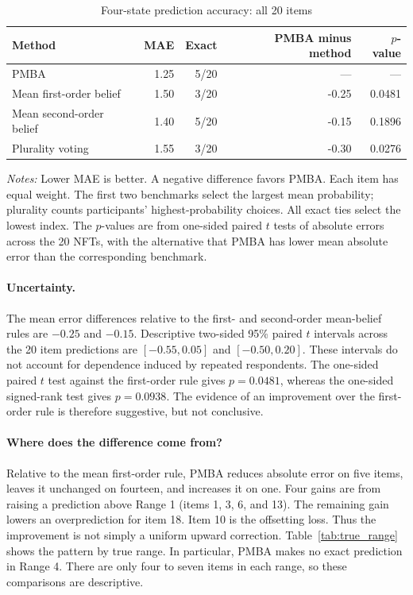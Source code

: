 \documentclass[12pt,reqno]{amsart}
\begin{document}
\begin{table}[htbp]
\centering\small
\caption{Four-state prediction accuracy: all 20 items}
\label{tab:prediction_errors}
\begin{tabular}{lrrrr}
\toprule
Method & MAE & Exact & PMBA minus method & $p$-value\\
\midrule
PMBA & 1.25 & 5/20 & --- & ---\\
Mean first-order belief & 1.50 & 3/20 & -0.25 & 0.0481\\
Mean second-order belief & 1.40 & 5/20 & -0.15 & 0.1896\\
Plurality voting & 1.55 & 3/20 & -0.30 & 0.0276\\
\bottomrule
\end{tabular}
\begin{minipage}{.94\textwidth}\footnotesize
\emph{Notes:} Lower MAE is better. A negative difference favors PMBA. Each item has equal weight. The first two benchmarks select the largest mean probability; plurality counts participants' highest-probability choices. All exact ties select the lowest index. The $p$-values are from one-sided paired $t$ tests of absolute errors across the 20 NFTs, with the alternative that PMBA has lower mean absolute error than the corresponding benchmark.
\end{minipage}
\end{table}

\paragraph{Uncertainty.}
The mean error differences  relative to the first- and second-order mean-belief rules are $-0.25$ and $-0.15$.  Descriptive two-sided 95\% paired $t$ intervals across the 20 item predictions are $[-0.55,0.05]$ and $[-0.50,0.20]$. These intervals do not account for dependence induced by repeated respondents.  The one-sided paired $t$ test against the first-order rule gives $p=0.0481$,  whereas the one-sided signed-rank test gives $p=0.0938$.  The evidence of an improvement over the first-order rule is therefore suggestive, but not conclusive.

\paragraph{Where does the difference come from?}
Relative to the mean first-order rule, PMBA reduces absolute error on five items, leaves it unchanged on fourteen, and increases it on one. Four gains are from raising a prediction above Range 1 (items 1, 3, 6, and 13). The remaining gain lowers an overprediction for item 18. Item 10 is the offsetting loss. Thus the improvement is not simply a uniform upward correction. Table~\ref{tab:true_range} shows the pattern by true range. In particular, PMBA makes no exact prediction in Range 4. There are only four to seven items in each range, so these comparisons are descriptive.
\end{document}
